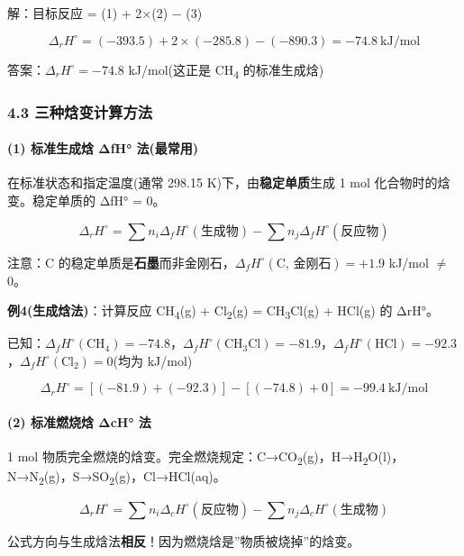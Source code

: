 \documentclass[a4paper,11pt]{ctexart}
\begin{document}
解：目标反应 = (1) + 2×(2) − (3)

\[\Delta_r H^\circ = (-393.5) + 2 \times (-285.8) - (-890.3) = -74.8\ \mathrm{kJ/mol}\]

答案：\(\Delta_r H^\circ = -74.8\) kJ/mol(这正是 CH\textsubscript{4} 的标准生成焓)

\subsubsection{4.3 三种焓变计算方法}\label{ux4e09ux79cdux7113ux53d8ux8ba1ux7b97ux65b9ux6cd5}

\paragraph{(1) 标准生成焓 ΔfH° 法(最常用)}\label{ux6807ux51c6ux751fux6210ux7113-ux3b4fh-ux6cd5ux6700ux5e38ux7528}

在标准状态和指定温度(通常 298.15 K)下，由\textbf{稳定单质}生成 1 mol 化合物时的焓变。稳定单质的 ΔfH° = 0。

\[
\boxed{\Delta_r H^\circ = \sum n_i \Delta_f H^\circ(\text{生成物}) - \sum n_j \Delta_f H^\circ(\text{反应物})}
\]

注意：C 的稳定单质是\textbf{石墨}而非金刚石，\(\Delta_f H^\circ(\text{C, 金刚石}) = +1.9\) kJ/mol \(\neq\) 0。

\textbf{例4(生成焓法)}：计算反应 CH\textsubscript{4}(g) + Cl\textsubscript{2}(g) = CH\textsubscript{3}Cl(g) + HCl(g) 的 ΔrH°。

已知：\(\Delta_f H^\circ(\text{CH}_4) = -74.8\)，\(\Delta_f H^\circ(\text{CH}_3\text{Cl}) = -81.9\)，\(\Delta_f H^\circ(\text{HCl}) = -92.3\)，\(\Delta_f H^\circ(\text{Cl}_2) = 0\)(均为 kJ/mol)

\[\Delta_r H^\circ = [(-81.9) + (-92.3)] - [(-74.8) + 0] = -99.4\ \mathrm{kJ/mol}\]

\paragraph{(2) 标准燃烧焓 ΔcH° 法}\label{ux6807ux51c6ux71c3ux70e7ux7113-ux3b4ch-ux6cd5}

1 mol 物质完全燃烧的焓变。完全燃烧规定：C→CO\textsubscript{2}(g)，H→H\textsubscript{2}O(l)，N→N\textsubscript{2}(g)，S→SO\textsubscript{2}(g)，Cl→HCl(aq)。

\[
\Delta_r H^\circ = \sum n_i \Delta_c H^\circ(\text{反应物}) - \sum n_j \Delta_c H^\circ(\text{生成物})
\]

公式方向与生成焓法\textbf{相反}！因为燃烧焓是''物质被烧掉''的焓变。
\end{document}
